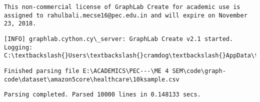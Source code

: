 \documentclass[11pt]{article}
\begin{document}
    \begin{Verbatim}[commandchars=\\\{\}]
This non-commercial license of GraphLab Create for academic use is assigned to rahulbali.mecse16@pec.edu.in and will expire on November 23, 2018.

    \end{Verbatim}

    \begin{Verbatim}[commandchars=\\\{\}]
[INFO] graphlab.cython.cy\_server: GraphLab Create v2.1 started. Logging: C:\textbackslash{}Users\textbackslash{}cramdog\textbackslash{}AppData\textbackslash{}Local\textbackslash{}Temp\textbackslash{}graphlab\_server\_1530133342.log.0

    \end{Verbatim}

    
    \begin{verbatim}
Finished parsing file E:\ACADEMICS\PEC---\ME 4 SEM\code\graph-code\dataset\amazon5core\healthcare\10ksample.csv
    \end{verbatim}

    
    
    \begin{verbatim}
Parsing completed. Parsed 10000 lines in 0.148133 secs.
    \end{verbatim}
\end{document}
